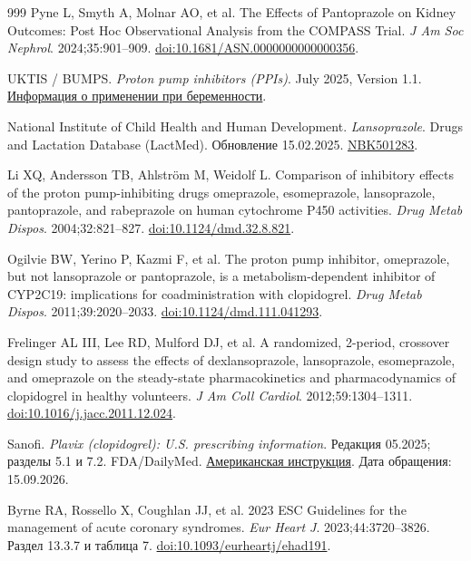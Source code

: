 \documentclass[11pt,a4paper,notitlepage]{report}
\begin{document}
\begin{thebibliography}{999}
 Pyne L, Smyth A, Molnar AO, et al. The Effects of Pantoprazole on Kidney Outcomes: Post Hoc Observational Analysis from the COMPASS Trial. \textit{J Am Soc Nephrol}. 2024;35:901--909. \href{https://doi.org/10.1681/ASN.0000000000000356}{doi:10.1681/ASN.0000000000000356}.

 UKTIS / BUMPS. \textit{Proton pump inhibitors (PPIs)}. July 2025, Version 1.1. \href{https://www.medicinesinpregnancy.org/leaflets-a-z/proton-pump-inhibitors/}{Информация о применении при беременности}.

 National Institute of Child Health and Human Development. \textit{Lansoprazole}. Drugs and Lactation Database (LactMed). Обновление 15.02.2025. \href{https://www.ncbi.nlm.nih.gov/books/NBK501283/}{NBK501283}.


 Li XQ, Andersson TB, Ahlström M, Weidolf L. Comparison of inhibitory effects of the proton pump-inhibiting drugs omeprazole, esomeprazole, lansoprazole, pantoprazole, and rabeprazole on human cytochrome P450 activities. \textit{Drug Metab Dispos}. 2004;32:821--827. \href{https://doi.org/10.1124/dmd.32.8.821}{doi:10.1124/dmd.32.8.821}.

 Ogilvie BW, Yerino P, Kazmi F, et al. The proton pump inhibitor, omeprazole, but not lansoprazole or pantoprazole, is a metabolism-dependent inhibitor of CYP2C19: implications for coadministration with clopidogrel. \textit{Drug Metab Dispos}. 2011;39:2020--2033. \href{https://doi.org/10.1124/dmd.111.041293}{doi:10.1124/dmd.111.041293}.

 Frelinger AL III, Lee RD, Mulford DJ, et al. A randomized, 2-period, crossover design study to assess the effects of dexlansoprazole, lansoprazole, esomeprazole, and omeprazole on the steady-state pharmacokinetics and pharmacodynamics of clopidogrel in healthy volunteers. \textit{J Am Coll Cardiol}. 2012;59:1304--1311. \href{https://doi.org/10.1016/j.jacc.2011.12.024}{doi:10.1016/j.jacc.2011.12.024}.

 Sanofi. \textit{Plavix (clopidogrel): U.S. prescribing information}. Редакция 05.2025; разделы 5.1 и 7.2. FDA/DailyMed. \href{https://dailymed.nlm.nih.gov/dailymed/fda/fdaDrugXsl.cfm?setid=de8b0b67-eb25-4684-83b5-7ad785314227}{Американская инструкция}. Дата обращения: 15.09.2026.

 Byrne RA, Rossello X, Coughlan JJ, et al. 2023 ESC Guidelines for the management of acute coronary syndromes. \textit{Eur Heart J}. 2023;44:3720--3826. Раздел 13.3.7 и таблица 7. \href{https://doi.org/10.1093/eurheartj/ehad191}{doi:10.1093/eurheartj/ehad191}.


\end{thebibliography}
\end{document}
